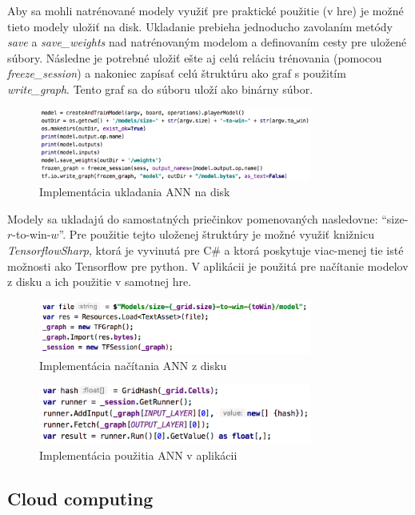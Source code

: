 Aby sa mohli natrénované modely využiť pre praktické použitie (v hre) je možné tieto modely uložiť na disk.
Ukladanie prebieha jednoducho zavolaním metódy \emph{save} a \emph{save\_weights} nad natrénovaným modelom a definovaním
cesty pre uložené súbory.
Následne je potrebné uložiť ešte aj celú reláciu trénovania (pomocou \emph{freeze\_session}) a nakoniec zapísať celú
štruktúru ako graf s použitím \emph{write\_graph}.
Tento graf sa do súboru uloží ako binárny súbor.
\begin{figure}[H]
    \centering
    \includegraphics[width=0.8\textwidth]{images/impl-ann-save.png}
    \caption{Implementácia ukladania ANN na disk}
\end{figure}\label{figure:ann-save-impl}
Modely sa ukladajú do samostatných priečinkov pomenovaných nasledovne: \enquote{size-$r$-to-win-$w$}.
Pre použitie tejto uloženej štruktúry je možné využiť knižnicu \emph{TensorflowSharp}, ktorá je vyvinutá pre C\# a ktorá
poskytuje viac-menej tie isté možnosti ako Tensorflow pre python.
V aplikácii je použitá pre načítanie modelov z disku a ich použitie v samotnej hre.
\begin{figure}[H]
    \centering
    \includegraphics[width=0.8\textwidth]{images/impl-ann-load.png}
    \caption{Implementácia načítania ANN z disku}
\end{figure}\label{figure:ann-load-impl}
\begin{figure}[H]
    \centering
    \includegraphics[width=0.8\textwidth]{images/impl-ann-usage.png}
    \caption{Implementácia použitia ANN v aplikácii}
\end{figure}\label{figure:ann-usage-impl}

\subsection{Cloud computing}\label{subsec:ci}

